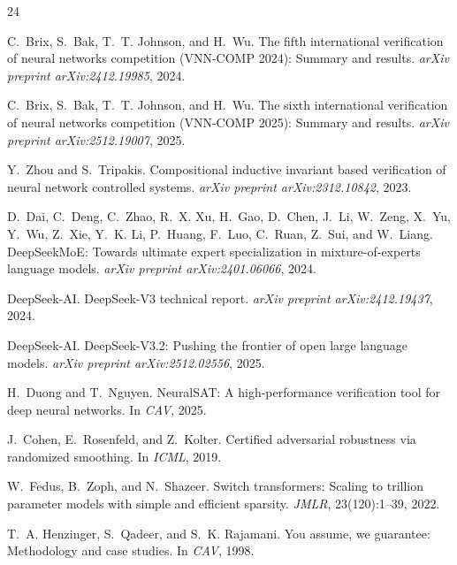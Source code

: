 \documentclass{article}
\theoremstyle{plain}
\theoremstyle{remark}
\begin{document}
\begin{thebibliography}{24}

C.~Brix, S.~Bak, T.~T. Johnson, and H.~Wu.
\newblock The fifth international verification of neural networks competition (VNN-COMP 2024): Summary and results.
\newblock \emph{arXiv preprint arXiv:2412.19985}, 2024.

C.~Brix, S.~Bak, T.~T. Johnson, and H.~Wu.
\newblock The sixth international verification of neural networks competition (VNN-COMP 2025): Summary and results.
\newblock \emph{arXiv preprint arXiv:2512.19007}, 2025.

Y.~Zhou and S.~Tripakis.
\newblock Compositional inductive invariant based verification of neural network controlled systems.
\newblock \emph{arXiv preprint arXiv:2312.10842}, 2023.

D.~Dai, C.~Deng, C.~Zhao, R.~X. Xu, H.~Gao, D.~Chen, J.~Li, W.~Zeng, X.~Yu, Y.~Wu, Z.~Xie, Y.~K. Li, P.~Huang, F.~Luo, C.~Ruan, Z.~Sui, and W.~Liang.
\newblock DeepSeekMoE: Towards ultimate expert specialization in mixture-of-experts language models.
\newblock \emph{arXiv preprint arXiv:2401.06066}, 2024.

DeepSeek-AI.
\newblock DeepSeek-V3 technical report.
\newblock \emph{arXiv preprint arXiv:2412.19437}, 2024.

DeepSeek-AI.
\newblock DeepSeek-V3.2: Pushing the frontier of open large language models.
\newblock \emph{arXiv preprint arXiv:2512.02556}, 2025.

H.~Duong and T.~Nguyen.
\newblock NeuralSAT: A high-performance verification tool for deep neural networks.
\newblock In \emph{CAV}, 2025.

J.~Cohen, E.~Rosenfeld, and Z.~Kolter.
\newblock Certified adversarial robustness via randomized smoothing.
\newblock In \emph{ICML}, 2019.

W.~Fedus, B.~Zoph, and N.~Shazeer.
\newblock Switch transformers: Scaling to trillion parameter models with simple and efficient sparsity.
\newblock \emph{JMLR}, 23(120):1--39, 2022.

T.~A. Henzinger, S.~Qadeer, and S.~K. Rajamani.
\newblock You assume, we guarantee: Methodology and case studies.
\newblock In \emph{CAV}, 1998.


\end{thebibliography}
\end{document}
